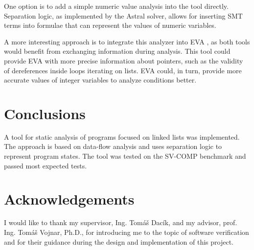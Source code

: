 \documentclass{ExcelAtFIT}
\begin{document}
One option is to add a simple numeric value analysis into the tool directly. Separation logic, as implemented by the Astral solver, allows for inserting SMT terms into formulae that can represent the values of numeric variables.

A more interesting approach is to integrate this analyzer into EVA \cite{eva}, as both tools would benefit from exchanging information during analysis. This tool could provide EVA with more precise information about pointers, such as the validity of dereferences inside loops iterating on lists. EVA could, in turn, provide more accurate values of integer variables to analyze conditions better.

\section{Conclusions}

A tool for static analysis of programs focused on linked lists was implemented. The approach is based on data-flow analysis and uses separation logic to represent program states. The tool was tested on the SV-COMP benchmark and passed most expected tests.

\section*{Acknowledgements}

I would like to thank my supervisor, Ing. Tomáš Dacík, and my advisor, prof. Ing. Tomáš Vojnar, Ph.D., for introducing me to the topic of software verification and for their guidance during the design and implementation of this project.



\end{document}
